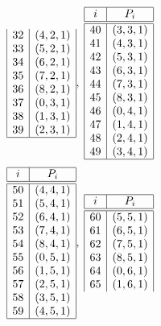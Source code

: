 {$$\begin{array}{|c|c|c|}
32 & ( 4, 2, 1 )\\
33 & ( 5, 2, 1 )\\
34 & ( 6, 2, 1 )\\
35 & ( 7, 2, 1 )\\
36 & ( 8, 2, 1 )\\
37 & ( 0, 3, 1 )\\
38 & ( 1, 3, 1 )\\
39 & ( 2, 3, 1 )\\
\hline
\end{array}
, \;
\begin{array}{|c|c|c|}
\hline
i & P_{i}\\
\hline
\hline
40 & ( 3, 3, 1 )\\
41 & ( 4, 3, 1 )\\
42 & ( 5, 3, 1 )\\
43 & ( 6, 3, 1 )\\
44 & ( 7, 3, 1 )\\
45 & ( 8, 3, 1 )\\
46 & ( 0, 4, 1 )\\
47 & ( 1, 4, 1 )\\
48 & ( 2, 4, 1 )\\
49 & ( 3, 4, 1 )\\
\hline
\end{array}
$$
$$
\begin{array}{|c|c|c|}
\hline
i & P_{i}\\
\hline
\hline
50 & ( 4, 4, 1 )\\
51 & ( 5, 4, 1 )\\
52 & ( 6, 4, 1 )\\
53 & ( 7, 4, 1 )\\
54 & ( 8, 4, 1 )\\
55 & ( 0, 5, 1 )\\
56 & ( 1, 5, 1 )\\
57 & ( 2, 5, 1 )\\
58 & ( 3, 5, 1 )\\
59 & ( 4, 5, 1 )\\
\hline
\end{array}
, \;
\begin{array}{|c|c|c|}
\hline
i & P_{i}\\
\hline
\hline
60 & ( 5, 5, 1 )\\
61 & ( 6, 5, 1 )\\
62 & ( 7, 5, 1 )\\
63 & ( 8, 5, 1 )\\
64 & ( 0, 6, 1 )\\
65 & ( 1, 6, 1 )\\

\end{array}$$}
